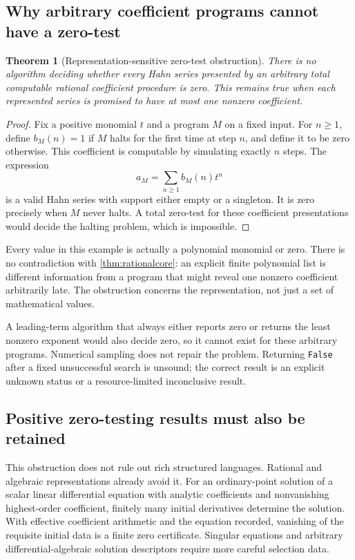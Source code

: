 \documentclass[11pt,letterpaper]{article}
\newtheorem{theorem}{Theorem}[section]
\theoremstyle{definition}\newtheorem{definition}[theorem]{Definition}
\theoremstyle{remark}\newtheorem{remark}[theorem]{Remark}
\newcommand{\code}[1]{\texttt{#1}}
\numberwithin{equation}{section}\setcounter{tocdepth}{2}
\begin{document}
\subsection{Why arbitrary coefficient programs cannot have a zero-test}
\begin{theorem}[Representation-sensitive zero-test obstruction]\label{thm:halting}
There is no algorithm deciding whether every Hahn series presented by an arbitrary total computable rational coefficient procedure is zero. This remains true when each represented series is promised to have at most one nonzero coefficient.
\end{theorem}
\begin{proof}
Fix a positive monomial $t$ and a program $M$ on a fixed input. For $n\ge1$, define $b_M(n)=1$ if $M$ halts for the first time at step $n$, and define it to be zero otherwise. This coefficient is computable by simulating exactly $n$ steps. The expression
\[
 a_M=\sum_{n\ge1}b_M(n)t^n
\]
is a valid Hahn series with support either empty or a singleton. It is zero precisely when $M$ never halts. A total zero-test for these coefficient presentations would decide the halting problem, which is impossible.
\end{proof}
Every value in this example is actually a polynomial monomial or zero. There is no contradiction with \cref{thm:rationalcore}: an explicit finite polynomial list is different information from a program that might reveal one nonzero coefficient arbitrarily late. The obstruction concerns the representation, not just a set of mathematical values.

A leading-term algorithm that always either reports zero or returns the least nonzero exponent would also decide zero, so it cannot exist for these arbitrary programs. Numerical sampling does not repair the problem. Returning \code{False} after a fixed unsuccessful search is unsound; the correct result is an explicit unknown status or a resource-limited inconclusive result.

\subsection{Positive zero-testing results must also be retained}
This obstruction does not rule out rich structured languages. Rational and algebraic representations already avoid it. For an ordinary-point solution of a scalar linear differential equation with analytic coefficients and nonvanishing highest-order coefficient, finitely many initial derivatives determine the solution. With effective coefficient arithmetic and the equation recorded, vanishing of the requisite initial data is a finite zero certificate. Singular equations and arbitrary differential-algebraic solution descriptors require more careful selection data.
\end{document}

